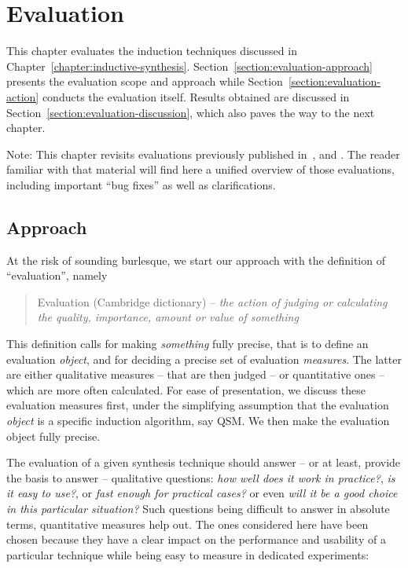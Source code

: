 \chapter{Evaluation\label{chapter:evaluation}}

This chapter evaluates the induction techniques discussed in Chapter~\ref{chapter:inductive-synthesis}. Section~\ref{section:evaluation-approach} presents the evaluation scope and approach while Section~\ref{section:evaluation-action} conducts the evaluation itself. Results obtained are discussed in Section~\ref{section:evaluation-discussion}, which also paves the way to the next chapter.

Note: This chapter revisits evaluations previously published in~\cite{Damas:2006}, \cite{Dupont:2008} and \cite{Lambeau:2008}. The reader familiar with that material will find here a unified overview of those evaluations, including important ``bug fixes'' as well as clarifications.

\section{Approach\label{section:evaluation-approach}}

At the risk of sounding burlesque, we start our approach with the definition of ``evaluation'', namely 

\begin{quotation}Evaluation (Cambridge dictionary) -- \emph{the action of judging or calculating the quality, importance, amount or value of something}\end{quotation}

This definition calls for making \emph{something} fully precise, that is to define an evaluation \emph{object}, and for deciding a precise set of evaluation \emph{measures}. The latter are either qualitative measures -- that are then judged -- or quantitative ones -- which are more often calculated. For ease of presentation, we discuss these evaluation measures first, under the simplifying assumption that the evaluation \emph{object} is a specific induction algorithm, say QSM. We then make the evaluation object fully precise.

The evaluation of a given synthesis technique should answer -- or at least, provide the basis to answer -- qualitative questions: \emph{how well does it work in practice?}, \emph{is it easy to use?}, or \emph{fast enough for practical cases?} or even \emph{will it be a good choice in this particular situation?} Such questions being difficult to answer in absolute terms, quantitative measures help out. The ones considered here have been chosen because they have a clear impact on the performance and usability of a particular technique while being easy to measure in dedicated experiments:


